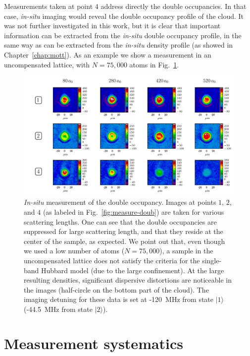 Measurements taken at point $\boxed{4}$ address directly the double
occupancies.  In that case, \textit{in-situ} imaging would reveal the double
occupancy profile of the cloud.  It was not further investigated in this work,
but it is clear that important information can be extracted from the
\textit{in-situ} double occupancy profile, in the same way as can be extracted
from the \textit{in-situ} density profile (as showed in
Chapter~\ref{chap:mott}).  As an example we show a measurement in an
uncompensated lattice, with $N=75,000$ atoms in Fig.~\ref{fig:insitu-doublons}.  
\begin{figure}
\centering
\includegraphics[width=\textwidth]{../figures/double_occ/doubleocc_Bstart100_k6_200_2Lock50_UncompLowNColumnDensity.png}
\caption[In-situ double occupancy measurement]{\textit{In-situ} measurement of
the double occupancy.  Images at points $\boxed{1}$, $\boxed{2}$, and
$\boxed{4}$ (as labeled in Fig.~\ref{fig:measure-doub}) are taken for various
scattering lengths.  One can see that the double occupancies are suppressed for
large scattering length, and that they reside at the center of the sample, as
expected.  We point out  that, even though we used a low number of atoms
($N=75,000$), a sample in the uncompensated lattice does not satisfy the
criteria for the single-band Hubbard model (due to the large confinement). At
the large resulting densities, significant dispersive distortions are
noticeable in the images (half-circle on the bottom part of the cloud). The
imaging detuning for these data is set at -120~MHz from state $|1\rangle$
(-44.5~MHz from state $|2\rangle$). } 
\label{fig:insitu-doublons}
\end{figure}

\section{Measurement systematics}

